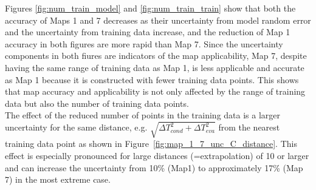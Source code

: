 Figures \ref{fig:num_train_model} and \ref{fig:num_train_train} show that both the accuracy of Maps 1 and 7 decreases as their uncertainty from model random error and the uncertainty from training data increase, and the reduction of Map 1 accuracy in both figures are more rapid than Map 7. Since the uncertainty components in both fiures are indicators of the map applicability, Map 7, despite having the same range of training data as Map 1, is less applicable and accurate as Map 1 because it is constructed with fewer training data points. This shows that map accuracy and applicability is not only affected by the range of training data but also the number of training data points.\\
The effect of the reduced number of points in the training data is a larger uncertainty for the same distance, e.g. $\sqrt{\Delta T_{cond}^2 + \Delta T_{eva}^2}$ from the nearest training data point as shown in Figure~\ref{fig:map_1_7_unc_C_distance}.  This effect is especially pronounced for large distances (=extrapolation) of 10\dgC{} or larger and can increase the uncertainty from 10\% (Map1) to approximately 17\% (Map 7) in the most extreme case.

